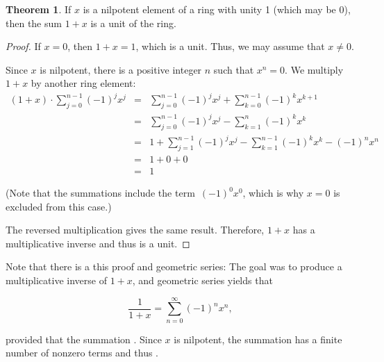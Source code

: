 \documentclass[12pt]{article}
\theoremstyle{definition}
\newtheorem*{thmplain}{Theorem}
\begin{document}
\begin{thmplain}
If $x$ is a nilpotent element of a ring with unity 1 (which may be 0), then the sum $1\!+\!x$ is a unit of the ring.
\end{thmplain}

\begin{proof}
If $x=0$, then $1\!+\!x=1$, which is a unit.  Thus, we may assume that $x \neq 0$.

Since $x$ is nilpotent, there is a positive integer $n$ such that $x^n=0$. We multiply $1\!+\!x$ by another ring element:
\begin{eqnarray*}
(1\!+\!x)\cdot\sum_{j=0}^{n-1}(-1)^jx^j
&=& \sum_{j=0}^{n-1}(-1)^jx^j\!+\!\sum_{k=0}^{n-1}(-1)^kx^{k+1}\\
&=& \sum_{j=0}^{n-1}(-1)^jx^j\!-\!\sum_{k=1}^n(-1)^kx^k\\
&=& 1\!+\!\sum_{j=1}^{n-1}(-1)^jx^j\!-\!\sum_{k=1}^{n-1}(-1)^kx^k\!-\!(-1)^nx^n\\
&=& 1\!+\!0\!+\!0\\
&=& 1
\end{eqnarray*}

(Note that the summations include the term\, $(-1)^0x^0$, which is why $x=0$ is excluded from this case.)

The reversed multiplication gives the same result. Therefore, $1\!+\!x$ has a multiplicative inverse and thus is a unit.
\end{proof}

Note that there is a  this proof and geometric series:  The goal was to produce a multiplicative inverse of $1\!+\!x$, and geometric series yields that

$$\displaystyle \frac{1}{1\!+\!x}=\sum_{n=0}^{\infty} (-1)^nx^n,$$

provided that the summation .  Since $x$ is nilpotent, the summation has a finite number of nonzero terms and thus .
\end{document}
